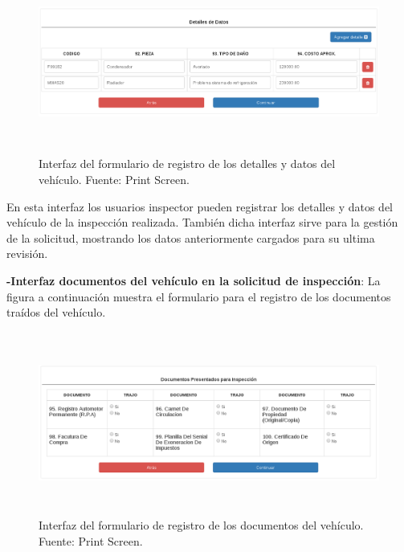 \begin{figure}[H]
\begin{center}
	\includegraphics[width=\textwidth,height=6cm]{img/interfaces/registro_detalles_datos_vehiculo.png}
\end{center}
\caption{Interfaz del formulario de registro de los detalles y datos del vehículo. Fuente: Print Screen.}
\label{fig:interfaz_registro_detalles_datos_vehiculo}
\end{figure}

En esta interfaz los usuarios inspector pueden registrar los detalles y datos del vehículo de la inspección realizada. También dicha interfaz sirve para la gestión de la solicitud, mostrando los datos anteriormente cargados para su ultima revisión.

\textbf{-Interfaz documentos del vehículo en la solicitud de inspección}: La figura a continuación muestra el formulario para el registro de los documentos traídos del vehículo.

\begin{figure}[H]
\begin{center}
	\includegraphics[width=\textwidth,height=6cm]{img/interfaces/registro_documentos_presentados_vehiculo.png}
\end{center}
\caption{Interfaz del formulario de registro de los documentos del vehículo. Fuente: Print Screen.}
\label{fig:interfaz_registro_documentos_vehiculo}
\end{figure}

